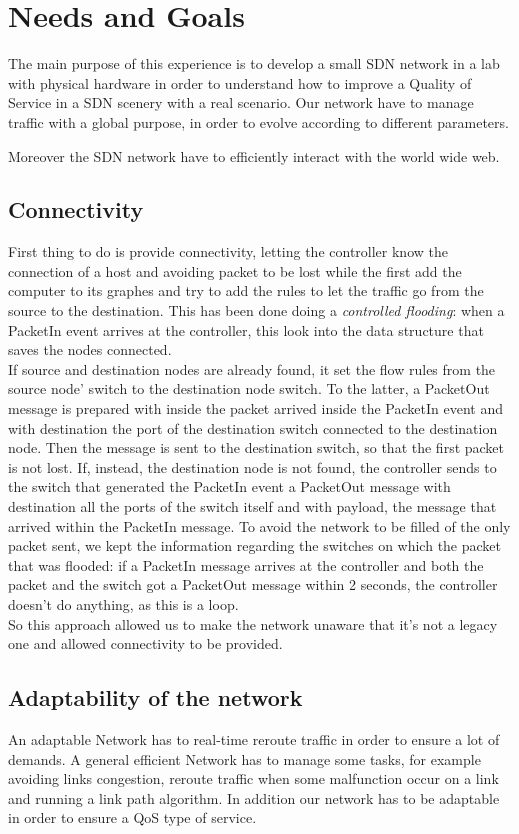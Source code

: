 \documentclass[article,10pt]{IEEEtran}
\begin{document}
\section{Needs and Goals}\label{sec:obb}
The main purpose of this experience is to develop a small SDN network in a lab with physical hardware
in order to understand how to improve a Quality of Service in a SDN scenery with a real scenario.
Our network have to manage traffic with a global purpose, in order to evolve according to different parameters.

Moreover the SDN network have to efficiently interact with the world wide web.

\subsection{Connectivity}\label{sec:connectivity}
First thing to do is provide connectivity, letting the controller know the connection of a host and avoiding packet to be lost while the first
add the computer to its graphes and try to add the rules to let the traffic go from the source to the destination. This has been done doing a
\textit{controlled flooding}: when a PacketIn event arrives at the controller, this look into the data structure that saves the nodes connected.
\\ If source and destination nodes are already found, it set the flow rules from the source node' switch to the destination node switch. To the latter,
a PacketOut message is prepared with inside the packet arrived inside the PacketIn event and with destination the port of the destination switch connected
to the destination node. Then the message is sent to the destination switch, so that the first packet is not lost.
If, instead, the destination node is not found, the controller sends to the switch that generated the PacketIn event a PacketOut message
with destination all the ports of the switch itself and with payload, the message that arrived within the PacketIn message.
To avoid the network to be filled of the only packet sent, we kept the information regarding the switches on which the packet that was flooded:
if a PacketIn message arrives at the controller and both the packet and the switch got a PacketOut message within 2 seconds, the controller doesn't
do anything, as this is a loop.
\\ So this approach allowed us to make the network unaware that it's not a legacy one and allowed connectivity to be provided.

\subsection{Adaptability of the network}
An adaptable Network has to real-time reroute traffic in order to ensure a lot of demands.
A general efficient Network has to manage some tasks, for example avoiding links congestion, reroute traffic when some malfunction occur on a link
and running a link path algorithm. 
In addition our network has to be adaptable in order to ensure a QoS type of service.
\end{document}
